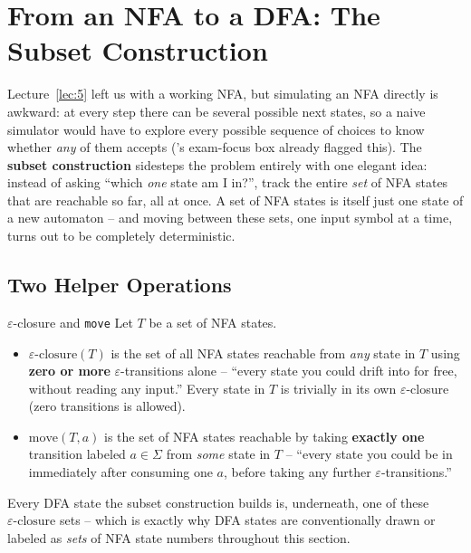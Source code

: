\documentclass[full-course-notes.tex]{subfiles}
\begin{document}
\section{From an NFA to a DFA: The Subset Construction}
\label{sec:l6-subset-construction}

\dbtag Lecture~\ref{lec:5} left us with a working NFA, but simulating an NFA directly is
awkward: at every step there can be several possible next states, so a naive simulator would
have to explore every possible sequence of choices to know whether \emph{any} of them accepts
('s exam-focus box already flagged this). The \textbf{subset
construction} sidesteps the problem entirely with one elegant idea: instead of asking ``which
\emph{one} state am I in?'', track the entire \emph{set} of NFA states that are reachable so
far, all at once. A set of NFA states is itself just one state of a new automaton -- and moving
between these sets, one input symbol at a time, turns out to be completely deterministic.

\subsection{Two Helper Operations}
\label{sec:l6-subset-helpers}

\begin{defbox}{$\varepsilon$-closure and \texttt{move}}
Let $T$ be a set of NFA states.
\begin{itemize}
  \item $\varepsilon\text{-closure}(T)$ is the set of all NFA states reachable from \emph{any}
  state in $T$ using \textbf{zero or more} $\varepsilon$-transitions alone -- ``every state you
  could drift into for free, without reading any input.'' Every state in $T$ is trivially in
  its own $\varepsilon$-closure (zero transitions is allowed).
  \item $\text{move}(T, a)$ is the set of NFA states reachable by taking \textbf{exactly one}
  transition labeled $a \in \Sigma$ from \emph{some} state in $T$ -- ``every state you could be
  in immediately after consuming one $a$, before taking any further $\varepsilon$-transitions.''
\end{itemize}
Every DFA state the subset construction builds is, underneath, one of these
$\varepsilon\text{-closure}$ sets -- which is exactly why DFA states are conventionally drawn or
labeled as \emph{sets} of NFA state numbers throughout this section.
\end{defbox}
\end{document}
